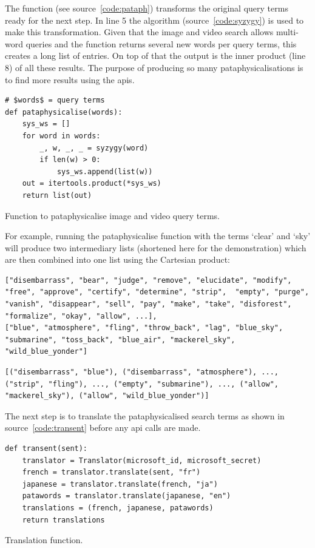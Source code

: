 The  function (see source~\ref{code:pataph}) transforms the original query terms ready for the next step. In line 5 the  algorithm (source~\ref{code:syzygy}) is used to make this transformation. Given that the image and video search allows multi-word queries and the  function returns several new words per query terms, this creates a long list of entries. On top of that the output is the inner product (line 8) of all these results. The purpose of producing so many pataphysicalisations is to find more results using the \glspl{api}.

\begin{listing}
  \begin{verbatim}
# $words$ = query terms
def pataphysicalise(words):
    sys_ws = []
    for word in words:
        _, w, _, _ = syzygy(word)
        if len(w) > 0:
            sys_ws.append(list(w))
    out = itertools.product(*sys_ws)
    return list(out)
  \end{verbatim}
\caption{Function to pataphysicalise image and video query terms.}
\label{code:pataph}
\end{listing}

For example, running the pataphysicalise function with the terms `clear' and `sky' will produce two intermediary lists (shortened here for the demonstration) which are then combined into one list using the Cartesian product:

\begin{verbatim}
["disembarrass", "bear", "judge", "remove", "elucidate", "modify", "free", "approve", "certify", "determine", "strip",  "empty", "purge", "vanish", "disappear", "sell", "pay", "make", "take", "disforest", "formalize", "okay", "allow", ...],
["blue", "atmosphere", "fling", "throw_back", "lag", "blue_sky", "submarine", "toss_back", "blue_air", "mackerel_sky", "wild_blue_yonder"]
\end{verbatim}
\begin{verbatim}
[("disembarrass", "blue"), ("disembarrass", "atmosphere"), ..., ("strip", "fling"), ..., ("empty", "submarine"), ..., ("allow", "mackerel_sky"), ("allow", "wild_blue_yonder")]
\end{verbatim}

The next step is to translate the pataphysicalised search terms as shown in source~\ref{code:transent} before any \gls{api} calls are made.

\begin{listing}
  \begin{verbatim}
def transent(sent):
    translator = Translator(microsoft_id, microsoft_secret)
    french = translator.translate(sent, "fr")
    japanese = translator.translate(french, "ja")
    patawords = translator.translate(japanese, "en")
    translations = (french, japanese, patawords)
    return translations
  \end{verbatim}
\caption{Translation function.}
\label{code:transent}
\end{listing}


